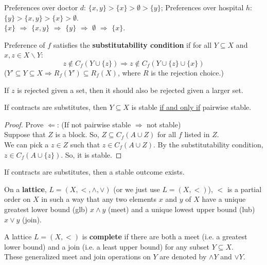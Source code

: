 \documentclass[11pt]{elegantbook}
\begin{document}
\begin{example}
    Preferences over doctor $d$: $\{x,y\}>\{x\}>\emptyset>\{y\}$; Preferences over hospital $h$: $\{y\}>\{x,y\}>\{x\}>\emptyset$.\\
    $\{x\}$ $\Rightarrow$ $\{x,y\}$ $\Rightarrow$ $\{y\}$ $\Rightarrow$ $\emptyset$ $\Rightarrow$ $\{x\}$.
\end{example}

\begin{definition}
    \normalfont
    Preference of $f$ satisfies the \textbf{substitutability condition} if for all $Y\subseteq X$ and $x,z\in X\backslash Y$:
    $$z\notin C_f(Y\cup\{z\}) \Rightarrow z\notin C_f(Y\cup\{z\}\cup\{x\})$$
    ($Y'\subseteq Y\subseteq X \Rightarrow R_f(Y')\subseteq R_f(X)$, where $R$ is the rejection choice.)
\end{definition}
If $z$ is rejected given a set, then it should also be rejected given a larger set.


\begin{theorem}
    If contracts are substitutes, then $Y\subseteq X$ is stable \underline{if and only if} pairwise stable.
\end{theorem}
\begin{proof}
    Prove $\Leftarrow$:
    (If not pairwise stable $\Rightarrow$ not stable)\\
    Suppose that $Z$ is a block. So, $Z\subseteq C_f(A\cup Z)$ for all $f$ listed in $Z$.\\
    We can pick a $z\in Z$ such that $z\in C_f(A\cup Z)$. By the substitutability condition, $z\in C_f(A\cup \{z\})$. So, it is stable.
\end{proof}

\begin{theorem}
    If contracts are substitutes, then a stable outcome exists.
\end{theorem}

\begin{definition}[Lattice]
    \normalfont
    On a \textbf{lattice}, $L=(X,<,\wedge,\vee)$ (or we just use $L=(X,<)$), $<$ is a partial order on $X$ in such a way that any two elements $x$ and $y$ of $X$ have a unique greatest lower bound (glb) $x \wedge y$ (meet) and a unique lowest upper bound (lub) $x \vee y$ (join).
\end{definition}



\begin{definition}
    \normalfont
    A lattice $L=(X,<)$ is \textbf{complete} if there are both a meet (i.e. a greatest lower bound) and a join (i.e. a least upper bound) for any subset $Y\subseteq X$.\\
    These generalized meet and join operations on $Y$ are denoted by $\wedge Y$ and $\vee Y$.
\end{definition}
\end{document}
